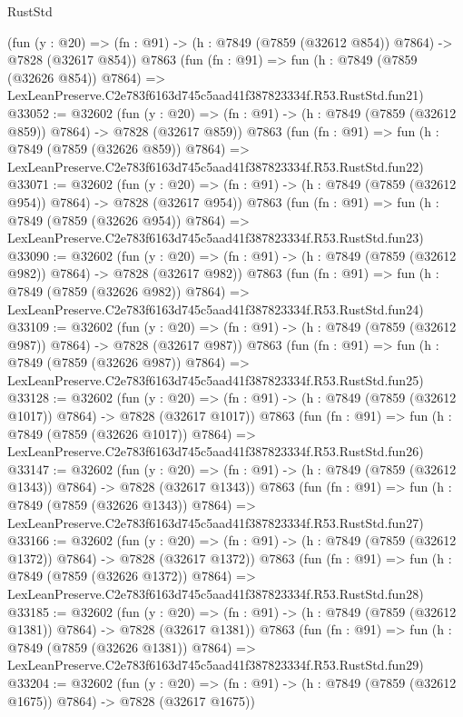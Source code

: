 \begin{lexlean}{RustStd}
\begin{coremodule}
    (fun (y : @20) => (fn : @91) -> (h : @7849 (@7859 (@32612 @854)) @7864) -> @7828 (@32617 @854))
    @7863
    (fun (fn : @91) =>
    fun (h : @7849 (@7859 (@32626 @854)) @7864) =>
    LexLeanPreserve.C2e783f6163d745c5aad41f387823334f.R53.RustStd.fun21)
@33052 := @32602
    (fun (y : @20) => (fn : @91) -> (h : @7849 (@7859 (@32612 @859)) @7864) -> @7828 (@32617 @859))
    @7863
    (fun (fn : @91) =>
    fun (h : @7849 (@7859 (@32626 @859)) @7864) =>
    LexLeanPreserve.C2e783f6163d745c5aad41f387823334f.R53.RustStd.fun22)
@33071 := @32602
    (fun (y : @20) => (fn : @91) -> (h : @7849 (@7859 (@32612 @954)) @7864) -> @7828 (@32617 @954))
    @7863
    (fun (fn : @91) =>
    fun (h : @7849 (@7859 (@32626 @954)) @7864) =>
    LexLeanPreserve.C2e783f6163d745c5aad41f387823334f.R53.RustStd.fun23)
@33090 := @32602
    (fun (y : @20) => (fn : @91) -> (h : @7849 (@7859 (@32612 @982)) @7864) -> @7828 (@32617 @982))
    @7863
    (fun (fn : @91) =>
    fun (h : @7849 (@7859 (@32626 @982)) @7864) =>
    LexLeanPreserve.C2e783f6163d745c5aad41f387823334f.R53.RustStd.fun24)
@33109 := @32602
    (fun (y : @20) => (fn : @91) -> (h : @7849 (@7859 (@32612 @987)) @7864) -> @7828 (@32617 @987))
    @7863
    (fun (fn : @91) =>
    fun (h : @7849 (@7859 (@32626 @987)) @7864) =>
    LexLeanPreserve.C2e783f6163d745c5aad41f387823334f.R53.RustStd.fun25)
@33128 := @32602
    (fun (y : @20) =>
    (fn : @91) -> (h : @7849 (@7859 (@32612 @1017)) @7864) -> @7828 (@32617 @1017))
    @7863
    (fun (fn : @91) =>
    fun (h : @7849 (@7859 (@32626 @1017)) @7864) =>
    LexLeanPreserve.C2e783f6163d745c5aad41f387823334f.R53.RustStd.fun26)
@33147 := @32602
    (fun (y : @20) =>
    (fn : @91) -> (h : @7849 (@7859 (@32612 @1343)) @7864) -> @7828 (@32617 @1343))
    @7863
    (fun (fn : @91) =>
    fun (h : @7849 (@7859 (@32626 @1343)) @7864) =>
    LexLeanPreserve.C2e783f6163d745c5aad41f387823334f.R53.RustStd.fun27)
@33166 := @32602
    (fun (y : @20) =>
    (fn : @91) -> (h : @7849 (@7859 (@32612 @1372)) @7864) -> @7828 (@32617 @1372))
    @7863
    (fun (fn : @91) =>
    fun (h : @7849 (@7859 (@32626 @1372)) @7864) =>
    LexLeanPreserve.C2e783f6163d745c5aad41f387823334f.R53.RustStd.fun28)
@33185 := @32602
    (fun (y : @20) =>
    (fn : @91) -> (h : @7849 (@7859 (@32612 @1381)) @7864) -> @7828 (@32617 @1381))
    @7863
    (fun (fn : @91) =>
    fun (h : @7849 (@7859 (@32626 @1381)) @7864) =>
    LexLeanPreserve.C2e783f6163d745c5aad41f387823334f.R53.RustStd.fun29)
@33204 := @32602
    (fun (y : @20) =>
    (fn : @91) -> (h : @7849 (@7859 (@32612 @1675)) @7864) -> @7828 (@32617 @1675))

\end{coremodule}
\end{lexlean}
